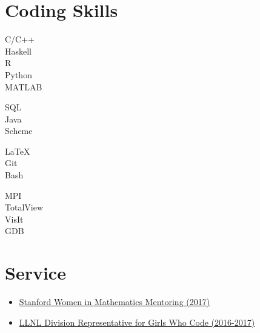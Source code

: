 \documentclass[10pt]{article} %
\begin{document}
\section{Coding Skills}
\begin{multicols}{4}
{
C/C++\\
Haskell\\
R\\
Python\\
MATLAB
}

{SQL\\
Java\\
Scheme\\
}

{
LaTeX\\ 
Git\\
Bash\\
}

{MPI\\
TotalView\\
VisIt\\
GDB\\
}

\end{multicols}

\section{Service}
\begin{itemize}
    \item[] \href{http://swimm.stanford.edu/}{Stanford Women in Mathematics Mentoring (2017)}
    \item[] \href{https://diversity.llnl.gov/outreach/stem-programs/code}{LLNL Division Representative for Girls Who Code (2016-2017)}
\end{itemize}
\end{document}
